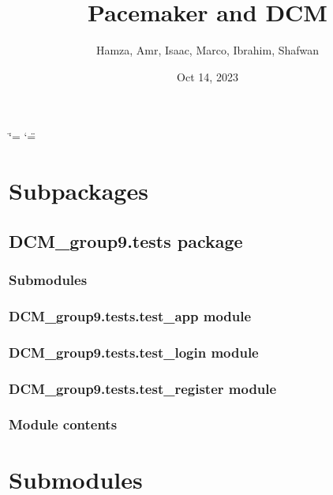 \documentclass[letterpaper,10pt,english]{sphinxmanual}
\title{Pacemaker and DCM}
\date{Oct 14, 2023}
\author{Hamza, Amr, Isaac, Marco, Ibrahim, Shafwan}
\begin{document}
\ifdefined\shorthandoff
  \ifnum\catcode`\=\string=\active\shorthandoff{=}\fi
  \ifnum\catcode`\"=\active{}\fi
\fi

\pagestyle{empty}
\sphinxmaketitle
\pagestyle{plain}
\sphinxtableofcontents
\pagestyle{normal}
\label{\detokenize{DCM_group9::doc}}



\chapter{Subpackages}
\label{\detokenize{DCM_group9:subpackages}}
\sphinxstepscope


\section{DCM\_group9.tests package}
\label{\detokenize{DCM_group9.tests:dcm-group9-tests-package}}\label{\detokenize{DCM_group9.tests::doc}}

\subsection{Submodules}
\label{\detokenize{DCM_group9.tests:submodules}}

\subsection{DCM\_group9.tests.test\_app module}
\label{\detokenize{DCM_group9.tests:dcm-group9-tests-test-app-module}}

\subsection{DCM\_group9.tests.test\_login module}
\label{\detokenize{DCM_group9.tests:dcm-group9-tests-test-login-module}}

\subsection{DCM\_group9.tests.test\_register module}
\label{\detokenize{DCM_group9.tests:dcm-group9-tests-test-register-module}}

\subsection{Module contents}
\label{\detokenize{DCM_group9.tests:module-contents}}

\chapter{Submodules}
\label{\detokenize{DCM_group9:submodules}}
\end{document}
